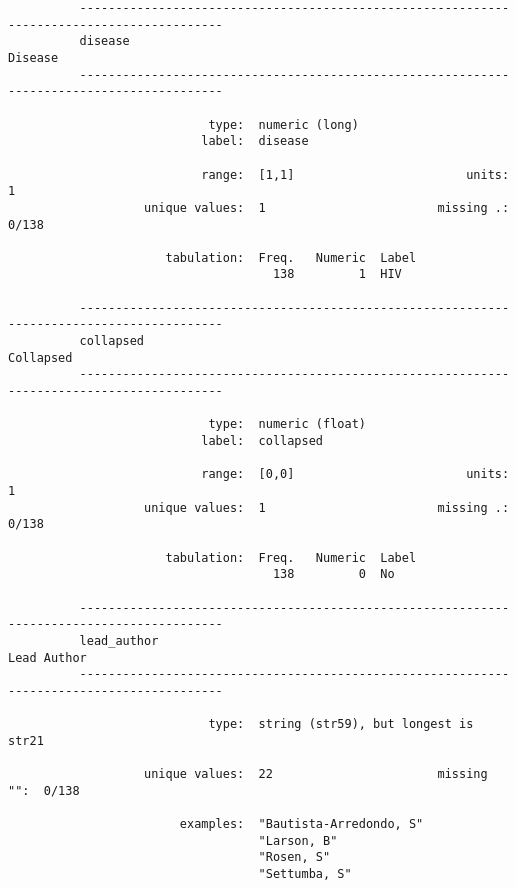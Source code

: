 \documentclass{article}
\begin{document}
\begin{verbatim}
          
          
          
          ------------------------------------------------------------------------------------------
          disease                                                                            Disease
          ------------------------------------------------------------------------------------------
          
                            type:  numeric (long)
                           label:  disease
          
                           range:  [1,1]                        units:  1
                   unique values:  1                        missing .:  0/138
          
                      tabulation:  Freq.   Numeric  Label
                                     138         1  HIV
          
          ------------------------------------------------------------------------------------------
          collapsed                                                                        Collapsed
          ------------------------------------------------------------------------------------------
          
                            type:  numeric (float)
                           label:  collapsed
          
                           range:  [0,0]                        units:  1
                   unique values:  1                        missing .:  0/138
          
                      tabulation:  Freq.   Numeric  Label
                                     138         0  No
          
          ------------------------------------------------------------------------------------------
          lead_author                                                                    Lead Author
          ------------------------------------------------------------------------------------------
          
                            type:  string (str59), but longest is str21
          
                   unique values:  22                       missing "":  0/138
          
                        examples:  "Bautista-Arredondo, S"
                                   "Larson, B"
                                   "Rosen, S"
                                   "Settumba, S"
          

\end{verbatim}
\end{document}
